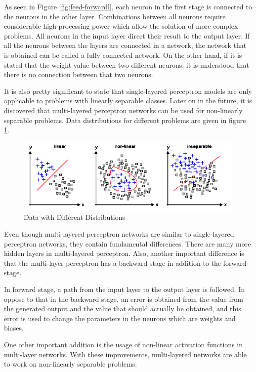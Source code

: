 As seen in Figure \ref{fig:feed-forwardl}, each neuron in the first stage is connected to the neurons in the other layer. Combinations between all neurons require considerable high processing power which allow the solution of more complex problems. All neurons in the input layer direct their result to the output layer. If all the neurons between the layers are connected in a network, the network that is obtained can be called a fully connected network. On the other hand, if it is stated that the weight value between two different neurons, it is understood that there is no connection between that two neurons.

It is also pretty significant to state that single-layered perceptron models are only applicable to problems with linearly separable classes. Later on in the future, it is discovered that multi-layered perceptron networks can be used for non-linearly separable problems. Data distributions for different problems are given in figure \ref{fig:data-diff-dist}.

\begin{figure}[h]
    \centering
    \includegraphics{figures/chapter3/linear-nonlinear-seperable.png}
    \caption{Data with Different Distributions}
    \label{fig:data-diff-dist}
\end{figure}

Even though multi-layered perceptron networks are similar to single-layered perceptron networks, they contain fundamental differences. There are many more hidden layers in multi-layered perceptron. Also, another important difference is that the multi-layer perceptron has a backward stage in addition to the forward stage.

In forward stage, a path from the input layer to the output layer is followed. In oppose to that in the backward stage, an error is obtained from the value from the generated output and the value that should actually be obtained, and this error is used to change the parameters in the neurons which are weights and biases.

One other important addition is the usage of non-linear activation functions in multi-layer networks. With these improvements, multi-layered networks are able to work on non-linearly separable problems.

